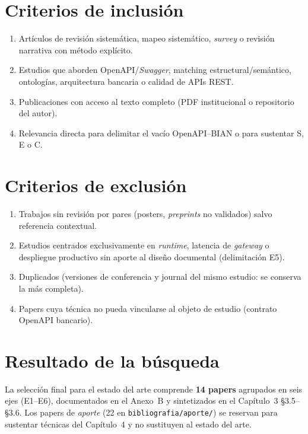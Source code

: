 \section{Criterios de inclusión}

\begin{enumerate}
  \item Artículos de revisión sistemática, mapeo sistemático, \textit{survey} o revisión
        narrativa con método explícito.
  \item Estudios que aborden OpenAPI/\textit{Swagger}, matching estructural/semántico, ontologías,
        arquitectura bancaria o calidad de APIs REST.
  \item Publicaciones con acceso al texto completo (PDF institucional o repositorio del autor).
  \item Relevancia directa para delimitar el vacío OpenAPI--BIAN o para sustentar S, E o C.
\end{enumerate}

\section{Criterios de exclusión}

\begin{enumerate}
  \item Trabajos sin revisión por pares (posters, \textit{preprints} no validados) salvo
        referencia contextual.
  \item Estudios centrados exclusivamente en \textit{runtime}, latencia de \textit{gateway} o
        despliegue productivo sin aporte al diseño documental (delimitación E5).
  \item Duplicados (versiones de conferencia y journal del mismo estudio: se conserva la más
        completa).
  \item Papers cuya técnica no pueda vincularse al objeto de estudio (contrato OpenAPI bancario).
\end{enumerate}

\section{Resultado de la búsqueda}

La selección final para el estado del arte comprende \textbf{14 papers} agrupados en seis ejes
(E1--E6), documentados en el Anexo~B y sintetizados en el Capítulo~3 §3.5--§3.6. Los papers de
\textit{aporte} (22 en \texttt{bibliografia/aporte/}) se reservan para sustentar técnicas del
Capítulo~4 y no sustituyen al estado del arte.
